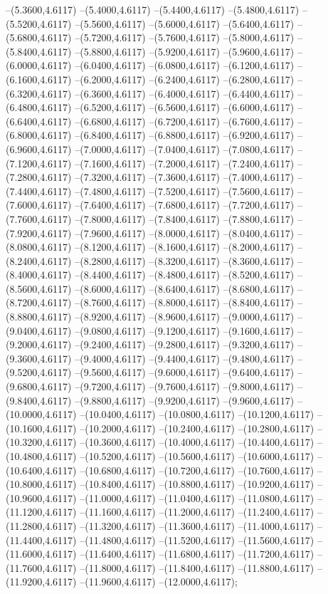 {	--(5.3600,4.6117)
	--(5.4000,4.6117)
	--(5.4400,4.6117)
	--(5.4800,4.6117)
	--(5.5200,4.6117)
	--(5.5600,4.6117)
	--(5.6000,4.6117)
	--(5.6400,4.6117)
	--(5.6800,4.6117)
	--(5.7200,4.6117)
	--(5.7600,4.6117)
	--(5.8000,4.6117)
	--(5.8400,4.6117)
	--(5.8800,4.6117)
	--(5.9200,4.6117)
	--(5.9600,4.6117)
	--(6.0000,4.6117)
	--(6.0400,4.6117)
	--(6.0800,4.6117)
	--(6.1200,4.6117)
	--(6.1600,4.6117)
	--(6.2000,4.6117)
	--(6.2400,4.6117)
	--(6.2800,4.6117)
	--(6.3200,4.6117)
	--(6.3600,4.6117)
	--(6.4000,4.6117)
	--(6.4400,4.6117)
	--(6.4800,4.6117)
	--(6.5200,4.6117)
	--(6.5600,4.6117)
	--(6.6000,4.6117)
	--(6.6400,4.6117)
	--(6.6800,4.6117)
	--(6.7200,4.6117)
	--(6.7600,4.6117)
	--(6.8000,4.6117)
	--(6.8400,4.6117)
	--(6.8800,4.6117)
	--(6.9200,4.6117)
	--(6.9600,4.6117)
	--(7.0000,4.6117)
	--(7.0400,4.6117)
	--(7.0800,4.6117)
	--(7.1200,4.6117)
	--(7.1600,4.6117)
	--(7.2000,4.6117)
	--(7.2400,4.6117)
	--(7.2800,4.6117)
	--(7.3200,4.6117)
	--(7.3600,4.6117)
	--(7.4000,4.6117)
	--(7.4400,4.6117)
	--(7.4800,4.6117)
	--(7.5200,4.6117)
	--(7.5600,4.6117)
	--(7.6000,4.6117)
	--(7.6400,4.6117)
	--(7.6800,4.6117)
	--(7.7200,4.6117)
	--(7.7600,4.6117)
	--(7.8000,4.6117)
	--(7.8400,4.6117)
	--(7.8800,4.6117)
	--(7.9200,4.6117)
	--(7.9600,4.6117)
	--(8.0000,4.6117)
	--(8.0400,4.6117)
	--(8.0800,4.6117)
	--(8.1200,4.6117)
	--(8.1600,4.6117)
	--(8.2000,4.6117)
	--(8.2400,4.6117)
	--(8.2800,4.6117)
	--(8.3200,4.6117)
	--(8.3600,4.6117)
	--(8.4000,4.6117)
	--(8.4400,4.6117)
	--(8.4800,4.6117)
	--(8.5200,4.6117)
	--(8.5600,4.6117)
	--(8.6000,4.6117)
	--(8.6400,4.6117)
	--(8.6800,4.6117)
	--(8.7200,4.6117)
	--(8.7600,4.6117)
	--(8.8000,4.6117)
	--(8.8400,4.6117)
	--(8.8800,4.6117)
	--(8.9200,4.6117)
	--(8.9600,4.6117)
	--(9.0000,4.6117)
	--(9.0400,4.6117)
	--(9.0800,4.6117)
	--(9.1200,4.6117)
	--(9.1600,4.6117)
	--(9.2000,4.6117)
	--(9.2400,4.6117)
	--(9.2800,4.6117)
	--(9.3200,4.6117)
	--(9.3600,4.6117)
	--(9.4000,4.6117)
	--(9.4400,4.6117)
	--(9.4800,4.6117)
	--(9.5200,4.6117)
	--(9.5600,4.6117)
	--(9.6000,4.6117)
	--(9.6400,4.6117)
	--(9.6800,4.6117)
	--(9.7200,4.6117)
	--(9.7600,4.6117)
	--(9.8000,4.6117)
	--(9.8400,4.6117)
	--(9.8800,4.6117)
	--(9.9200,4.6117)
	--(9.9600,4.6117)
	--(10.0000,4.6117)
	--(10.0400,4.6117)
	--(10.0800,4.6117)
	--(10.1200,4.6117)
	--(10.1600,4.6117)
	--(10.2000,4.6117)
	--(10.2400,4.6117)
	--(10.2800,4.6117)
	--(10.3200,4.6117)
	--(10.3600,4.6117)
	--(10.4000,4.6117)
	--(10.4400,4.6117)
	--(10.4800,4.6117)
	--(10.5200,4.6117)
	--(10.5600,4.6117)
	--(10.6000,4.6117)
	--(10.6400,4.6117)
	--(10.6800,4.6117)
	--(10.7200,4.6117)
	--(10.7600,4.6117)
	--(10.8000,4.6117)
	--(10.8400,4.6117)
	--(10.8800,4.6117)
	--(10.9200,4.6117)
	--(10.9600,4.6117)
	--(11.0000,4.6117)
	--(11.0400,4.6117)
	--(11.0800,4.6117)
	--(11.1200,4.6117)
	--(11.1600,4.6117)
	--(11.2000,4.6117)
	--(11.2400,4.6117)
	--(11.2800,4.6117)
	--(11.3200,4.6117)
	--(11.3600,4.6117)
	--(11.4000,4.6117)
	--(11.4400,4.6117)
	--(11.4800,4.6117)
	--(11.5200,4.6117)
	--(11.5600,4.6117)
	--(11.6000,4.6117)
	--(11.6400,4.6117)
	--(11.6800,4.6117)
	--(11.7200,4.6117)
	--(11.7600,4.6117)
	--(11.8000,4.6117)
	--(11.8400,4.6117)
	--(11.8800,4.6117)
	--(11.9200,4.6117)
	--(11.9600,4.6117)
	--(12.0000,4.6117);
}
